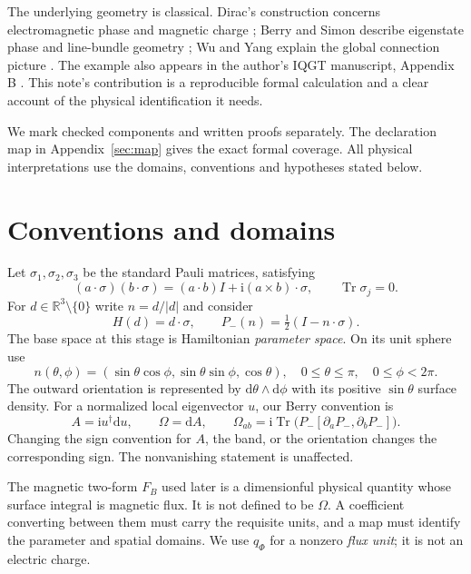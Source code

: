 \documentclass[11pt]{article}
\theoremstyle{definition}\newtheorem{definition}[theorem]{Definition}
\theoremstyle{remark}\newtheorem{remark}[theorem]{Remark}
\newcommand{\Tr}{\operatorname{Tr}}
\newcommand{\ii}{\mathrm{i}}
\newcommand{\dd}{\mathrm{d}}
\newcommand{\R}{\mathbb{R}}
\begin{document}
The underlying geometry is classical. Dirac's construction concerns electromagnetic phase and magnetic charge \cite{dirac}; Berry and Simon describe eigenstate phase and line-bundle geometry \cite{berry,simon}; Wu and Yang explain the global connection picture \cite{wuyang}. The example also appears in the author's IQGT manuscript, Appendix B \cite{iqgt}. This note's contribution is a reproducible formal calculation and a clear account of the physical identification it needs.

We mark checked components and written proofs separately. The declaration map in Appendix~\ref{sec:map} gives the exact formal coverage. All physical interpretations use the domains, conventions and hypotheses stated below.

\section{Conventions and domains}
Let $\sigma_1,\sigma_2,\sigma_3$ be the standard Pauli matrices, satisfying
\begin{equation}\label{eq:pauli}
 (a\cdot\sigma)(b\cdot\sigma)=(a\cdot b)I+\ii(a\times b)\cdot\sigma,
 \qquad \Tr\sigma_j=0.
\end{equation}
For $d\in\R^3\setminus\{0\}$ write $n=d/|d|$ and consider
\begin{equation}\label{eq:h}
 H(d)=d\cdot\sigma,\qquad P_-(n)=\tfrac12(I-n\cdot\sigma).
\end{equation}
The base space at this stage is Hamiltonian \emph{parameter space}. On its unit sphere use
\begin{equation}\label{eq:n}
 n(\theta,\phi)=(\sin\theta\cos\phi,\sin\theta\sin\phi,\cos\theta),
 \quad 0\leq\theta\leq\pi,\quad 0\leq\phi<2\pi.
\end{equation}
The outward orientation is represented by $\dd\theta\wedge\dd\phi$ with its positive $\sin\theta$ surface density. For a normalized local eigenvector $u$, our Berry convention is
\begin{equation}\label{eq:berryconv}
 A=\ii u^\dagger\dd u,\qquad \Omega=\dd A,
 \qquad \Omega_{ab}=\ii\Tr\bigl(P_-[\partial_aP_-,\partial_bP_-]\bigr).
\end{equation}
Changing the sign convention for $A$, the band, or the orientation changes the corresponding sign. The nonvanishing statement is unaffected.

The magnetic two-form $F_B$ used later is a dimensionful physical quantity whose surface integral is magnetic flux. It is not defined to be $\Omega$. A coefficient converting between them must carry the requisite units, and a map must identify the parameter and spatial domains. We use $q_\Phi$ for a nonzero \emph{flux unit}; it is not an electric charge.
\end{document}
